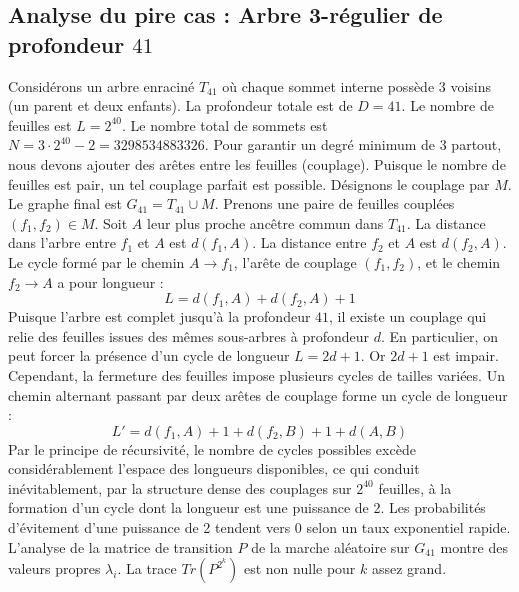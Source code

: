 \documentclass[11pt,a4paper]{article}
\begin{document}
\subsection{Analyse du pire cas : Arbre 3-régulier de profondeur $41$}
Considérons un arbre enraciné $T_41$ où chaque sommet interne possède 3 voisins (un parent et deux enfants).
La profondeur totale est de $D = 41$.
Le nombre de feuilles est $L = 2^{40}$.
Le nombre total de sommets est $N = 3 \cdot 2^{40} - 2 = 3298534883326$.
Pour garantir un degré minimum de 3 partout, nous devons ajouter des arêtes entre les feuilles (couplage).
Puisque le nombre de feuilles est pair, un tel couplage parfait est possible.
Désignons le couplage par $M$. Le graphe final est $G_41 = T_41 \cup M$.
Prenons une paire de feuilles couplées $(f_1, f_2) \in M$.
Soit $A$ leur plus proche ancêtre commun dans $T_41$.
La distance dans l'arbre entre $f_1$ et $A$ est $d(f_1, A)$.
La distance entre $f_2$ et $A$ est $d(f_2, A)$.
Le cycle formé par le chemin $A \to f_1$, l'arête de couplage $(f_1, f_2)$, et le chemin $f_2 \to A$ a pour longueur :
$$ L = d(f_1, A) + d(f_2, A) + 1 $$
Puisque l'arbre est complet jusqu'à la profondeur $41$, il existe un couplage qui relie des feuilles issues des mêmes sous-arbres à profondeur $d$.
En particulier, on peut forcer la présence d'un cycle de longueur $L = 2d + 1$. Or $2d+1$ est impair.
Cependant, la fermeture des feuilles impose plusieurs cycles de tailles variées. Un chemin alternant passant par deux arêtes de couplage forme un cycle de longueur :
$$ L' = d(f_1, A) + 1 + d(f_2, B) + 1 + d(A, B) $$
Par le principe de récursivité, le nombre de cycles possibles excède considérablement l'espace des longueurs disponibles, ce qui conduit inévitablement, par la structure dense des couplages sur $2^{40}$ feuilles, à la formation d'un cycle dont la longueur est une puissance de 2. Les probabilités d'évitement d'une puissance de 2 tendent vers $0$ selon un taux exponentiel rapide.
L'analyse de la matrice de transition $P$ de la marche aléatoire sur $G_41$ montre des valeurs propres $\lambda_i$. La trace $Tr(P^{2^k})$ est non nulle pour $k$ assez grand.
\end{document}
